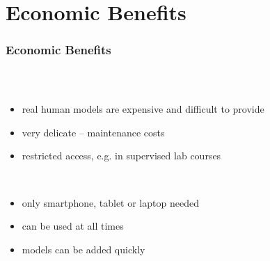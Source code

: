 \section{Economic Benefits}

\begin{frame}
  \frametitle{Economic Benefits}
  \begin{columns}
    \begin{column}{0.8\textwidth}
      \begin{description}[]
        \item[Costs of ordinary teaching] \hfill \\
        \begin{itemize}
          \item real human models are expensive and difficult to provide
          \item very delicate -- maintenance costs
          \item restricted access, e.g. in supervised lab courses
        \end{itemize}

        \bigskip
        \item[Costs using our application] \hfill \\
          \begin{itemize}
            \item only smartphone, tablet or laptop needed
            \item can be used at all times
            \item models can be added quickly
        \end{itemize}
      \end{description}
    \end{column}


\end{columns}
\end{frame}

